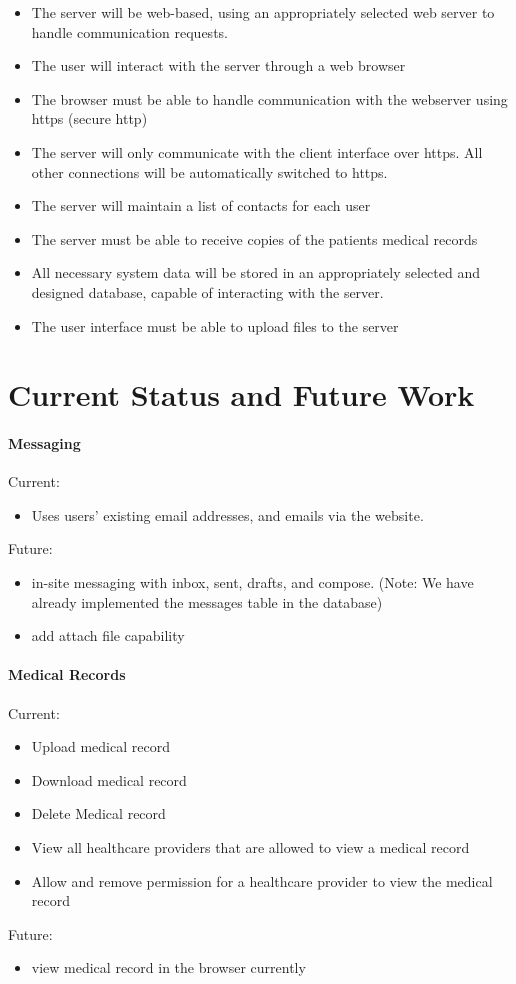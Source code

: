 \begin{itemize}
\item The server will be web-based, using an appropriately selected web server to handle communication requests.
\item The user will interact with the server through a web browser
\item The browser must be able to handle communication with the webserver using https (secure http)
\item The server will only communicate with the client interface over https.  All other connections will be automatically switched to https.
\item The server will maintain a list of contacts for each user
\item The server must be able to receive copies of the patients medical records
\item All necessary system data will be stored in an appropriately selected and designed database, capable of interacting with the server.
\item The user interface must be able to upload files to the server
\end{itemize}

\chapter{Current Status and Future Work}

\subsubsection{Messaging}
Current: 
\begin{itemize}
\item Uses users' existing email addresses, and emails via the website. 
\end{itemize}
Future: 
\begin{itemize}
\item in-site messaging with inbox, sent, drafts, and compose. (Note: We have already implemented the messages table in the database)
\item add attach file capability
\end{itemize}

\subsubsection{Medical Records}
Current: 
\begin{itemize}
\item Upload medical record
\item Download medical record
\item Delete Medical record
\item View all healthcare providers that are allowed to view a medical record
\item Allow and remove permission for a healthcare provider to view the medical record
\end{itemize}
Future:
\begin{itemize}
\item view medical record in the browser currently 
\end{itemize}

